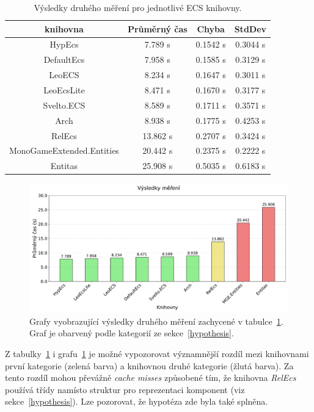 \begin{table}[!htb]
    \centering\footnotesize\sf
    \begin{tabular}{c c c c}
        \toprule
        knihovna & Průměrný čas & Chyba & StdDev \\
        \midrule
        HypEcs & 7.789 s & 0.1542 s & 0.3044 s \\
        DefaultEcs & 7.958 s & 0.1585 s & 0.3129 s \\
        LeoECS & 8.234 s & 0.1647 s & 0.3011 s \\
        LeoEcsLite & 8.471 s & 0.1670 s & 0.3177 s \\
        Svelto.ECS & 8.589 s & 0.1711 s & 0.3571 s \\
        Arch & 8.938 s & 0.1775 s & 0.4253 s \\
        RelEcs & 13.862 s & 0.2707 s & 0.3424 s \\
        MonoGameExtended.Entities & 20.442 s & 0.2375 s & 0.2222 s \\
        Entitas & 25.908 s & 0.5035 s & 0.6183 s \\
        \bottomrule
    \end{tabular}
    \caption{Výsledky druhého měření pro jednotlivé ECS knihovny.}
    \label{tab:second-benchmark-results}
\end{table}

\begin{figure}[!htb]
    \centering
    \includegraphics[width=1.0\linewidth]{plots/second_benchmark_results.pdf}
    \caption{Grafy vyobrazující výsledky druhého měření zachycené v tabulce~\ref{tab:second-benchmark-results}. Graf je obarvený podle kategorií ze sekce~\ref{hypothesis}.}
    \label{fig:second-benchmark-results}
\end{figure}

Z tabulky~\ref{tab:second-benchmark-results} i grafu~\ref{fig:second-benchmark-results} je možné vypozorovat významnější rozdíl mezi knihovnami první kategorie (zelená barva) a knihovnou druhé kategorie (žlutá barva). Za tento rozdíl mohou převážně \textit{cache misses} způsobené tím, že knihovna \textit{RelEcs} používá třídy namísto struktur pro reprezentaci komponent (viz sekce~\ref{hypothesis}). Lze pozorovat, že hypotéza zde byla také splněna.

